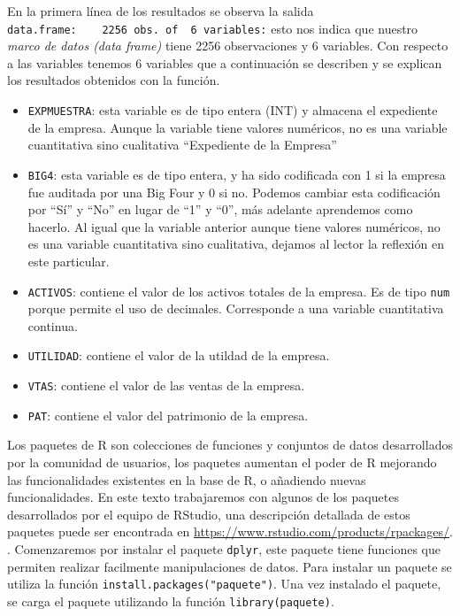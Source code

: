 \documentclass[]{book}
\providecommand{\tightlist}{%
  \setlength{\itemsep}{0pt}\setlength{\parskip}{0pt}}
\begin{document}
En la primera línea de los resultados se observa la salida
\texttt{\textquotesingle{}data.frame\textquotesingle{}:\ \ \ \ 2256\ obs.\ of\ \ 6\ variables:}
esto nos indica que nuestro \emph{marco de datos (data frame)} tiene
2256 observaciones y 6 variables. Con respecto a las variables tenemos 6
variables que a continuación se describen y se explican los resultados
obtenidos con la función.

\begin{itemize}
\tightlist
\item
  \texttt{EXPMUESTRA}: esta variable es de tipo entera (INT) y almacena
  el expediente de la empresa. Aunque la variable tiene valores
  numéricos, no es una variable cuantitativa sino cualitativa
  ``Expediente de la Empresa''
\item
  \texttt{BIG4}: esta variable es de tipo entera, y ha sido codificada
  con 1 si la empresa fue auditada por una Big Four y 0 si no. Podemos
  cambiar esta codificación por ``Sí'' y ``No'' en lugar de ``1'' y
  ``0'', más adelante aprendemos como hacerlo. Al igual que la variable
  anterior aunque tiene valores numéricos, no es una variable
  cuantitativa sino cualitativa, dejamos al lector la reflexión en este
  particular.
\item
  \texttt{ACTIVOS}: contiene el valor de los activos totales de la
  empresa. Es de tipo \texttt{num} porque permite el uso de decimales.
  Corresponde a una variable cuantitativa continua.
\item
  \texttt{UTILIDAD}: contiene el valor de la utildad de la empresa.
\item
  \texttt{VTAS}: contiene el valor de las ventas de la empresa.
\item
  \texttt{PAT}: contiene el valor del patrimonio de la empresa.
\end{itemize}

Los paquetes de R son colecciones de funciones y conjuntos de datos
desarrollados por la comunidad de usuarios, los paquetes aumentan el
poder de R mejorando las funcionalidades existentes en la base de R, o
añadiendo nuevas funcionalidades. En este texto trabajaremos con algunos
de los paquetes desarrollados por el equipo de RStudio, una descripción
detallada de estos paquetes puede ser encontrada en
\url{https://www.rstudio.com/products/rpackages/}. . Comenzaremos por
instalar el paquete \texttt{dplyr}, este paquete tiene funciones que
permiten realizar facilmente manipulaciones de datos. Para instalar un
paquete se utiliza la función \texttt{install.packages("paquete")}. Una
vez instalado el paquete, se carga el paquete utilizando la función
\texttt{library(paquete)}.
\end{document}
